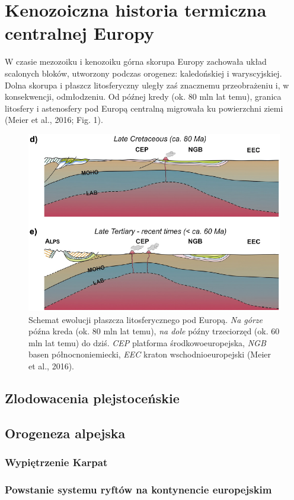 \documentclass[11.5pt,twoside]{report}
\begin{document}
	
	\tableofcontents
	
	\chapter{Kenozoiczna historia termiczna centralnej Europy}
	
W czasie mezozoiku i kenozoiku górna skorupa Europy zachowała układ scalonych bloków, utworzony podczas orogenez: kaledońskiej i waryscyjskiej. Dolna skorupa i płaszcz litosferyczny uległy zaś znacznemu przeobrażeniu i, w konsekwencji, odmłodzeniu. Od pó\'{z}nej kredy (ok. 80 mln lat temu), granica litosfery i astenosfery pod Europą centralną migrowała ku powierzchni ziemi (Meier et al., 2016; Fig. 1). 

\begin{figure}[h]
	\centering
	\includegraphics[width=0.5\linewidth]{../Termika/Meier2016}
	\caption{Schemat ewolucji płaszcza litosferycznego pod Europą. \textit{Na górze} późna kreda (ok. 80 mln lat temu), \textit{na dole} późny trzeciorzęd (ok. 60 mln lat temu) do dziś. \textit{CEP} platforma środkowoeuropejska, \textit{NGB} basen północnoniemiecki, \textit{EEC} kraton wschodnioeuropejski (Meier et al., 2016).}
	\label{Fig.}
\end{figure}
	
	\section{Zlodowacenia plejstoceńskie}
	
	\section{Orogeneza alpejska}
	
	\subsection{Wypiętrzenie Karpat}
	
	\subsection{Powstanie systemu ryftów na kontynencie europejskim}
	
\end{document}
